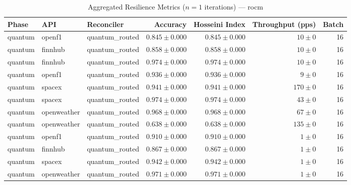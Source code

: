 
\begin{table}[htbp]
\caption{Aggregated Resilience Metrics ($n=1$ iterations) --- rocm}
\begin{tabular}{l l l r r r r}
\hline
Phase & API & Reconciler & Accuracy & Hosseini Index & Throughput (pps) & Batch \\
\hline
quantum & openf1 & quantum\_routed & $0.845\pm0.000$ & $0.845\pm0.000$ & $10\pm0$ & 16 \\
quantum & finnhub & quantum\_routed & $0.858\pm0.000$ & $0.858\pm0.000$ & $10\pm0$ & 16 \\
quantum & finnhub & quantum\_routed & $0.974\pm0.000$ & $0.974\pm0.000$ & $10\pm0$ & 16 \\
quantum & openf1 & quantum\_routed & $0.936\pm0.000$ & $0.936\pm0.000$ & $9\pm0$ & 16 \\
quantum & spacex & quantum\_routed & $0.941\pm0.000$ & $0.941\pm0.000$ & $170\pm0$ & 16 \\
quantum & spacex & quantum\_routed & $0.974\pm0.000$ & $0.974\pm0.000$ & $43\pm0$ & 16 \\
quantum & openweather & quantum\_routed & $0.968\pm0.000$ & $0.968\pm0.000$ & $67\pm0$ & 16 \\
quantum & openweather & quantum\_routed & $0.638\pm0.000$ & $0.638\pm0.000$ & $135\pm0$ & 16 \\
quantum & openf1 & quantum\_routed & $0.910\pm0.000$ & $0.910\pm0.000$ & $1\pm0$ & 16 \\
quantum & finnhub & quantum\_routed & $0.867\pm0.000$ & $0.867\pm0.000$ & $1\pm0$ & 16 \\
quantum & spacex & quantum\_routed & $0.942\pm0.000$ & $0.942\pm0.000$ & $1\pm0$ & 16 \\
quantum & openweather & quantum\_routed & $0.971\pm0.000$ & $0.971\pm0.000$ & $1\pm0$ & 16 \\
\hline
\end{tabular}
\end{table}
